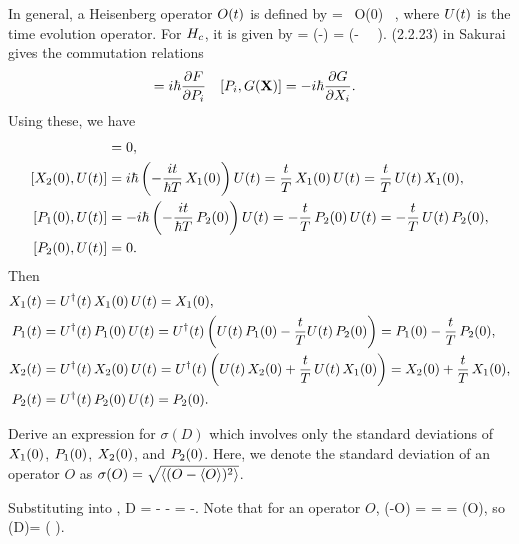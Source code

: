 \begin{solution}
	In general, a Heisenberg operator $O(t)$ is defined by
	\beq
		\Ot = \Udt \, O(0) \, \Ut,
	\eeq
	where $U(t)$ is the time evolution operator.  For $H_c$, it is given by
	\beq
		\Ut = \exp(-) = \exp(- \, \Xqo \, \Pwo).
	\eeq
	(2.2.23) in Sakurai gives the commutation relations
	\begin{align*}
		[X_i, F(\vec{P})] &= \ihb \pdv{F}{P_i} &
		[P_i, G(\vec{X})] &= -\ihb \pdv{G}{X_i}.
	\end{align*}
	Using these, we have
	\begin{align*}
		[\Xqo, \Ut] &= 0, \\
		[\Xwo, \Ut] &= \ihb \left( -\frac{i t}{\hbar T} \, \Xqo \right) \Ut = \frac{t}{T} \, \Xqo \, \Ut = \frac{t}{T} \, \Ut \, \Xqo, \\
		[\Pqo, \Ut] &= -\ihb \left( -\frac{i t}{\hbar T} \, \Pwo \right) \Ut = -\frac{t}{T} \, \Pwo \, \Ut = -\frac{t}{T} \, \Ut \, \Pwo, \\
		[\Pwo, \Ut] &= 0.
	\end{align*}
	Then
	\begin{align}
		X_1(t) &= U^\dagger(t) \, X_1(0) \, U(t) = X_1(0), \label{Xqt} \\
		P_1(t) &= U^\dagger(t) \, P_1(0) \, U(t) = U^\dagger(t) \left( U(t) \, P_1(0) - \frac{t}{T} U(t) \, P_2(0) \right) = P_1(0) - \frac{t}{T} \, P_2(0), \label{Pqt} \\
		X_2(t) &= U^\dagger(t) \, X_2(0) \, U(t) = U^\dagger(t) \left( U(t) \, X_2(0) + \frac{t}{T} \, U(t) \, X_1(0)  \right) = X_2(0) + \frac{t}{T} \, X_1(0), \label{Xwt} \\
		P_2(t) &= U^\dagger(t) \, P_2(0) \, U(t) = P_2(0). \label{Pwt}
	\end{align}
\end{solution}

\newcommand{\sigD}{\sigma(D)}
\newcommand{\sigN}{\sigma(N)}

\begin{problem}
	Derive an expression for $\sigD$ which involves only the standard deviations of $X_1(0)$, $P_1(0)$, $X_2(0)$, and $P_2(0)$.  Here, we denote the standard deviation of an operator $O$ as $\sigma(O) = \sqrt{\ev{(O - \ev{O})^2}}$.
\end{problem}

\begin{solution}
	Substituting  into ,
	\beq
		D = \Pqo -  \Pwo - \Pqo = -\Pwo.
	\eeq
	Note that for an operator $O$,
	\beq
		\sigma(-O) =  =  = \sigma(O),
	\eeq
	so
	\beqn \label{sigD}
		\sigD = \sigma\big( \Pwo \big).
	\eeqn
\end{solution}

